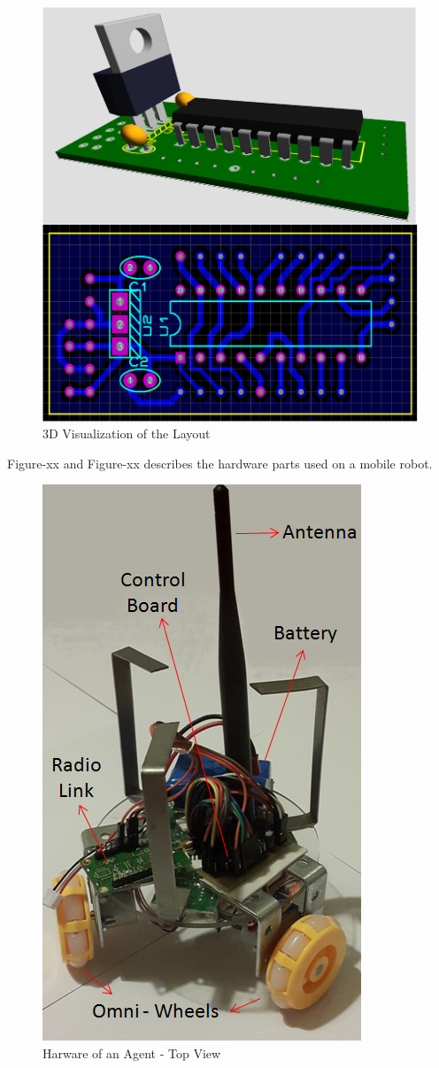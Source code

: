\documentclass[twoside]{article}
\begin{document}
	\begin{figure}[H]
		\caption{3D Visualization of the Layout}
		\centerline{\includegraphics[scale = 0.60]{sematik-layout}}
	\end{figure} 
Figure-xx and Figure-xx describes the hardware parts used on a mobile robot.
			\begin{figure}[H]
				\caption{Harware of an Agent - Top View}
				\centerline{\includegraphics[scale = 0.80]{hardware1}}
			\end{figure} 
\end{document}
